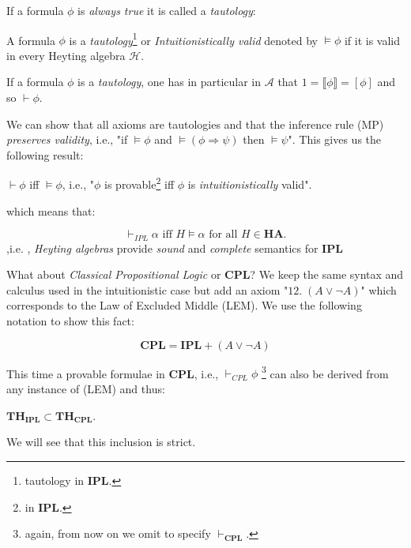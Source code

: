 			If a formula $\phi$ is \emph{always true} it is called a \emph{tautology}:
		
		\begin{definition}
			A formula $\phi$ is a \emph{tautology}\footnote{tautology in \textbf{IPL}.} or \emph{Intuitionistically valid} denoted by $\vDash \phi$ if it is valid in every Heyting algebra $\mathcal{H}$.
		\end{definition}	
		
		\begin{remark}
			If a formula $\phi$ is a \emph{tautology}, one has in particular in $\mathcal{A}$ that $1 = \llbracket \phi \rrbracket = [\phi]$ and so $\vdash \phi$. 
		\end{remark}	
		
		We can show that all axioms are tautologies and that the inference rule (MP) \emph{preserves validity}, i.e., "if $\vDash \phi$ and $\vDash (\phi \Rightarrow \psi)$ then $\vDash \psi$". \newline
		This gives us the following result:
		
		\begin{prop}
			$\vdash \phi$ iff  $\vDash \phi$, i.e., "$\phi$ is provable\footnote{in \textbf{IPL}.} iff $\phi$ is \emph{intuitionistically} valid".
		\end{prop}
		
		which means that:
		
		\begin{prop}
			\begin{equation*}
				\vdash_{IPL} \alpha \text{ iff } H \vDash \alpha \text{ for all } H \in \mathbf{HA}.
			\end{equation*}
			,i.e. , \emph{Heyting algebras} provide \emph{sound} and \emph{complete} semantics for \textbf{IPL}
		\end{prop}

		What about \emph{Classical Propositional Logic} or \textbf{CPL}? 
	\newline
	We keep the same syntax and calculus used in the intuitionistic case but add an axiom "$12. \; (A \lor \neg A)$" which corresponds to the Law of Excluded Middle (LEM).\newline
	We use the following notation to show this fact:
	
		\[ \textbf{CPL} = \textbf{IPL} + (A \lor \neg A) \]
 
	This time a provable formulae in \textbf{CPL}, i.e., $\vdash_{CPL} \phi$ \footnote{again, from now on we omit to specify $\vdash_{\textbf{CPL}}$.} can also be derived from any instance of (LEM) and thus:
	\begin{prop}
		$\textbf{TH}_\textbf{IPL} \subset \textbf{TH}_\textbf{CPL}$.
	\end{prop}
	We will see that this inclusion is strict. \newline
	
